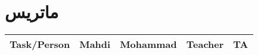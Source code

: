 \chapter{ماتریس }
\begin{table}[H]
\begin{latin}
\begin{center}
\begin{tabular}{|c|c|c|c|c|}
\hline
Task/Person & Mahdi & Mohammad & Teacher & TA \\
\hline
\end{tabular}
\end{center}
\end{latin}
\end{table}
